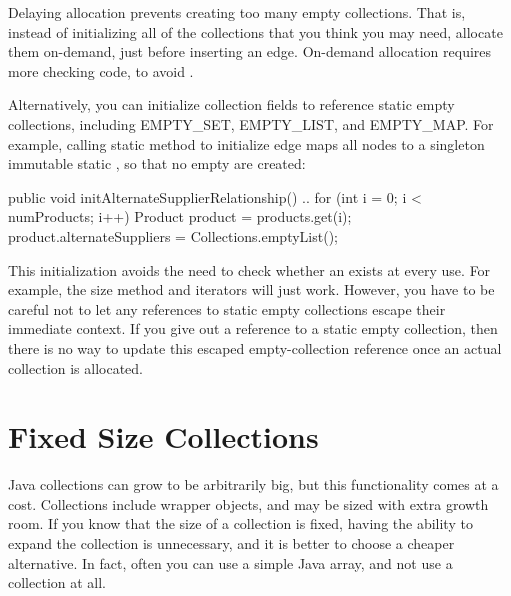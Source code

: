  Delaying allocation prevents creating too many empty collections.
 That is, instead of initializing all of the collections that you think you
 may need, allocate them on-demand, just before inserting an edge. On-demand
 allocation requires more checking code, to avoid .
 
 Alternatively, you can initialize collection fields to reference static empty collections,
 including EMPTY\_SET,
 EMPTY\_LIST, and EMPTY\_MAP. For example, 
 calling static method  to initialize edge
  maps all nodes to a singleton immutable static
 , so that no empty  are created:
 \begin{shortlisting}
     public void initAlternateSupplierRelationship() {
       ..
       for (int i = 0; i < numProducts; i++) {
          Product product = products.get(i);
          product.alternateSuppliers = Collections.emptyList();
       }
     } 
 \end{shortlisting}
This initialization avoids the need to check whether an 
exists at every use. For example, the size method and iterators will just work.
However, you have to be careful not to let any references to static empty
collections escape their immediate context. 
If you give out a reference to a static empty collection, 
then there is no way to update this escaped empty-collection reference
once an actual collection is allocated. 

\section{Fixed Size Collections}

Java collections can grow to be
arbitrarily big, but this functionality comes at a cost.
Collections include wrapper objects, and 
may be sized with extra growth room. If
you know that the size of a collection is fixed, having the ability to expand
the collection is unnecessary, and it is better to choose a cheaper alternative.
In fact, often you can use a
simple Java array, and not use a collection at all.  

